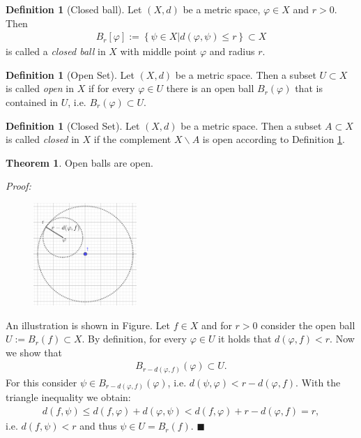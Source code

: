 \documentclass[12pt, a4paper]{article}
\numberwithin{equation}{section}
\theoremstyle{definition}
\theoremstyle{definition}
\newtheorem{defn}[thm]{Definition} %
\newtheorem{theorem}[thm]{Theorem}
\begin{document}
	 \begin{defn}[Closed ball]
		Let $(X, d)$ be a metric space, $\varphi\in X$ and $r > 0$. Then 
		\begin{align}
			B_{r}[\varphi] := \left\{ \psi\in X \vert d(\varphi, \psi) \leq r\right\} \subset X
		\end{align}
		is called a \textit{closed ball} in $X$ with middle point $\varphi$ and radius $r$. 
	\end{defn}
	
	\begin{defn}[Open Set]
		\label{defn-open-set}
		Let $(X, d)$ be a metric space. Then a subset $U\subset X$ is called \textit{open} in $X$ if for every $\varphi \in U$ there is an open ball $B_{r}(\varphi)$ that is contained in $U$, i.e. $B_r(\varphi)\subset U$. 
	\end{defn}

	\begin{defn}[Closed Set]
		Let $(X, d)$ be a metric space. Then a subset $A\subset X$ is called \textit{closed} in $X$ if the complement $X\backslash A$ is open according to Definition \ref{defn-open-set}. 
	\end{defn}

	\begin{theorem}\label{open-balls-open}
		Open balls are open. 
	\end{theorem}
	\noindent\textit{Proof:}
	\begin{figure}[h!]
		\centering
		\includegraphics[width=0.35\textwidth]{Figures/open-balls-open.png}
	\end{figure}
	An illustration is shown in Figure. Let $f\in X$ and for $r > 0$ consider the open ball $U:= B_{r}(f) \subset X$. By definition, for every $\varphi \in U$ it holds that $d\left(\varphi, f\right) < r$. Now we show that 
	\begin{align}
		B_{r-d\left(\varphi, f\right)}(\varphi) \subset U.
	\end{align}
	For this consider $\psi\in B_{r-d\left(\varphi, f\right)}(\varphi)$, i.e. $d(\psi, \varphi) < r - d(\varphi, f)$. With the triangle inequality we obtain: 
	\begin{align}
		d(f, \psi) \leq d(f, \varphi) + d(\varphi, \psi) < d(f, \varphi) + r - d(\varphi, f) = r,  		
	\end{align}
	i.e. $d(f, \psi) < r$ and thus $\psi\in U = B_{r}(f)$.  \qquad\qquad\qquad\qquad\qquad\qquad\qquad\qquad\qquad\qquad\qquad\qquad\qquad\quad$\blacksquare$
	
\end{document}
